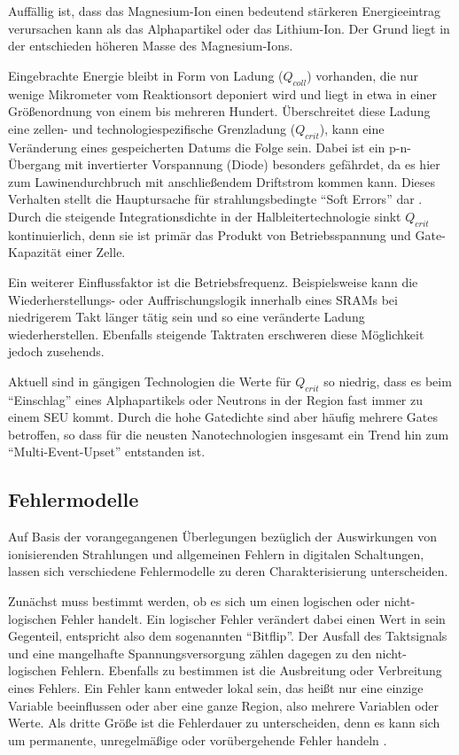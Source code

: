 Auffällig ist, dass das Magnesium-Ion einen bedeutend stärkeren
Energieeintrag verursachen kann als das Alphapartikel oder das
Lithium-Ion. Der Grund liegt in der entschieden höheren Masse des Magnesium-Ions.

Eingebrachte Energie bleibt in Form von Ladung ($Q_{coll}$) vorhanden,
die nur wenige Mikrometer vom Reaktionsort deponiert wird und liegt in
etwa in einer Größenordnung von einem bis mehreren
Hundert\unit{}{\femto\coulomb}. Überschreitet diese Ladung eine
zellen- und technologiespezifische Grenzladung ($Q_{crit}$), kann eine
Veränderung eines gespeicherten Datums die Folge sein. Dabei ist ein
p-n-Übergang mit invertierter Vorspannung (Diode) besonders gefährdet,
da es hier zum Lawinendurchbruch mit anschließendem Driftstrom kommen
kann. Dieses Verhalten stellt die Hauptursache für strahlungsbedingte
``Soft Errors'' dar \cite{baumann2005b}. Durch die steigende
Integrationsdichte in der Halbleitertechnologie sinkt $Q_{crit}$
kontinuierlich, denn sie ist primär das Produkt von Betriebsspannung
und Gate-Kapazität einer Zelle.

Ein weiterer Einflussfaktor ist die Betriebsfrequenz. Beispielsweise
kann die Wie\-der\-her\-stel\-lungs- oder Auffrischungslogik innerhalb eines
SRAMs bei niedrigerem Takt länger tätig sein und so eine veränderte
Ladung wiederherstellen. Ebenfalls steigende Taktraten erschweren
diese Möglichkeit jedoch zusehends.

Aktuell sind in gängigen Technologien die Werte für $Q_{crit}$ so
niedrig, dass es beim ``Einschlag'' eines Alphapartikels oder Neutrons
in der Region fast immer zu einem SEU kommt. Durch die hohe
Gatedichte sind aber häufig mehrere Gates betroffen, so dass für die
neusten Nanotechnologien insgesamt ein Trend hin zum
``Multi-Event-Upset'' entstanden ist.

\subsection{Fehlermodelle}
\label{sec:grundlagen_fehlermodelle}
Auf Basis der vorangegangenen Überlegungen bezüglich der Auswirkungen
von ionisierenden Strahlungen und allgemeinen Fehlern in digitalen
Schaltungen, lassen sich verschiedene Fehlermodelle zu deren
Charakterisierung unterscheiden. 

Zunächst muss bestimmt werden, ob es sich um einen logischen oder
nicht-lo\-gisch\-en Fehler handelt. Ein logischer Fehler verändert dabei
einen Wert in sein Gegenteil, entspricht also dem sogenannten
``Bitflip''. Der Ausfall des Taktsignals und eine mangelhafte
Spannungsversorgung zählen dagegen zu den nicht-logischen
Fehlern. Ebenfalls zu bestimmen ist die Ausbreitung oder Verbreitung
eines Fehlers. Ein Fehler kann entweder lokal sein, das heißt nur eine
einzige Variable beeinflussen oder aber eine ganze Region, also
mehrere Variablen oder Werte. Als dritte Größe ist die Fehlerdauer zu
unterscheiden, denn es kann sich um permanente, unregelmäßige oder
vorübergehende Fehler handeln \cite[S. 12ff.]{lala1985}.

